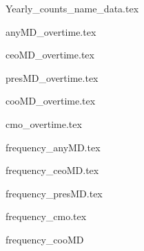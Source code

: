 \documentclass[12pt]{article}
\begin{document}
\footnotesize

    {Yearly_counts_name_data.tex}

    \newpage

    {anyMD_overtime.tex}
   
    \vspace{3mm}

    {ceoMD_overtime.tex}

    \vspace{3mm}

    {presMD_overtime.tex}

    \vspace{3mm}

    {cooMD_overtime.tex}

    \vspace{3mm}

    {cmo_overtime.tex}

    \newpage
    \vspace{5mm}

    {frequency_anyMD.tex}

    \vspace{3mm}

    {frequency_ceoMD.tex}

    \vspace{3mm}

    {frequency_presMD.tex}

    \vspace{3mm}

    {frequency_cmo.tex}

    \vspace{3mm}

    {frequency_cooMD}

    

    

    

    

    

    

	
	
	
\end{document}
